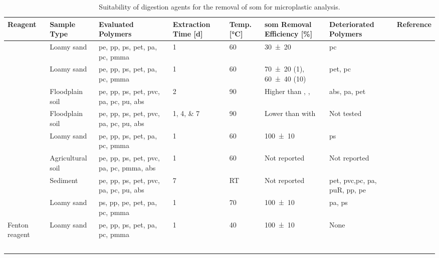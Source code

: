 \begin{table}
	\centering\footnotesize
	\caption{Suitability of digestion agents for the removal of \ac{som} for microplastic analysis.}\label{tab:som-removal}
	\begin{tabulary}{1.0\textwidth}{LLLLLLLL}
		\toprule
		{Reagent} & {Sample Type} & {Evaluated Polymers} & {Extraction Time [\si{\day}]} & {Temp. [\si{\degreeCelsius}]} & {\Acs{som} Removal Efficiency [\si{\percent}]} & {Deteriorated Polymers} & {Reference} \\
		\midrule
		 & Loamy sand & \acs{pe}, \acs{pp}, \acs{ps}, \acs{pet}, \acs{pa}, \acs{pc}, \acs{pmma}  & \num{1} & \num{60} & \num{30(20)} & \acs{pc} & \citet{HurleyValidation2018} \\
		 & Loamy sand & \acs{pe}, \acs{pp}, \acs{ps}, \acs{pet}, \acs{pa}, \acs{pc}, \acs{pmma} & \num{1} & \num{60} & \num{70(20)} (\SI{1}{\Molar}), \num{60(40)} (\SI{10}{\Molar}) & \acs{pet}, \acs{pc} & \citet{HurleyValidation2018} \\
		 & Floodplain soil & \acs{pe}, \acs{pp}, \acs{ps}, \acs{pet}, \acs{pvc}, \acs{pa}, \acs{pc}, \acs{pu}, \acs{abs} & \num{2} & \num{90} & Higher than , ,  & \acs{abs}, \acs{pa}, \acs{pet} & \citet{ScheurerMicroplastics2018} \\
		 & Floodplain soil & \acs{pe}, \acs{pp}, \acs{ps}, \acs{pet}, \acs{pvc}, \acs{pa}, \acs{pc}, \acs{pu}, \acs{abs} & \numlist{1;4;7} & \num{90} & Lower than with  & Not tested & \citet{ScheurerMicroplastics2018} \\
		 & Loamy sand & \acs{pe}, \acs{pp}, \acs{ps}, \acs{pet}, \acs{pa}, \acs{pc}, \acs{pmma} & \num{1} & \num{60} & \num{100(10)} & \acs{ps} & \citet{HurleyValidation2018} \\
		 & Agricultural soil & \acs{pe}, \acs{pp}, \acs{ps}, \acs{pet}, \acs{pvc}, \acs{pa}, \acs{pc}, \acs{pmma}, \acs{abs}  & \num{1} & \num{60} & Not reported & Not reported & \citet{LiuMethod2019} \\
		 & Sediment & \acs{pe}, \acs{pp}, \acs{ps}, \acs{pet}, \acs{pvc}, \acs{pa}, \acs{pc}, \acs{pu}, \acs{abs} & \num{7} & RT & Not reported & \acs{pet}, \acs{pvc},\acs{pc}, \acs{pa}, \acs{pu}R, \acs{pp}, \acs{pe} & \citet{NuelleNew2014} \\
		 & Loamy sand & \acs{ps}, \acs{pp}, \acs{pe}, \acs{pet}, \acs{pa}, \acs{pc}, \acs{pmma} & \num{1} & \num{70} & \num{100(10)} & \acs{pa}, \acs{ps} & \citet{HurleyValidation2018}  \\
		Fenton reagent & Loamy sand & \acs{pe}, \acs{pp}, \acs{ps}, \acs{pet}, \acs{pa}, \acs{pc}, \acs{pmma} & \num{1} & \num{40} & \num{100(10)} & None & \citet{HurleyValidation2018} \\
		\bottomrule
		~
	\end{tabulary}
\end{table}

